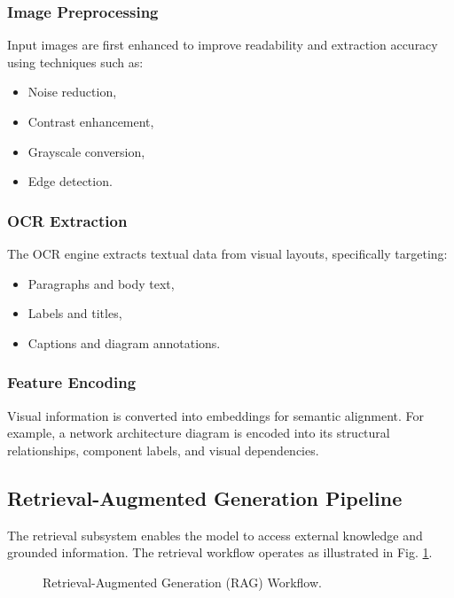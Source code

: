 \documentclass[conference]{IEEEtran}
\begin{document}
\subsubsection{Image Preprocessing}
Input images are first enhanced to improve readability and extraction accuracy using techniques such as:
\begin{itemize}
    \item Noise reduction,
    \item Contrast enhancement,
    \item Grayscale conversion,
    \item Edge detection.
\end{itemize}

\subsubsection{OCR Extraction}
The OCR engine extracts textual data from visual layouts, specifically targeting:
\begin{itemize}
    \item Paragraphs and body text,
    \item Labels and titles,
    \item Captions and diagram annotations.
\end{itemize}

\subsubsection{Feature Encoding}
Visual information is converted into embeddings for semantic alignment. For example, a network architecture diagram is encoded into its structural relationships, component labels, and visual dependencies.

\subsection{Retrieval-Augmented Generation Pipeline}
The retrieval subsystem enables the model to access external knowledge and grounded information. The retrieval workflow operates as illustrated in Fig. \ref{fig:rag_flow}.

\begin{figure}[htbp]
\centering
{}
\caption{Retrieval-Augmented Generation (RAG) Workflow.}
\label{fig:rag_flow}
\end{figure}
\end{document}
